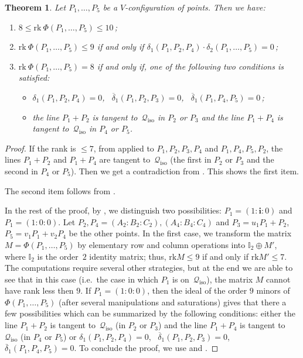 \documentclass{amsart}
\theoremstyle{plain}
\newtheorem{theorem}[lemma]{Theorem}
\theoremstyle{definition}
\newcommand{\iso}{\mathcal{Q}_{\mathrm{iso}}}
\newcommand{\iii}{\textbf{i}}
\newcommand{\rk}{\ensuremath{\mathrm{rk}}}
\begin{document}
\begin{theorem}
\label{theorem:rank_V}
Let $P_1, \dots, P_5$ be a $V$-configuration of
points. Then we have:
\begin{enumerate}
\item $8 \leq \rk \ \Phi(P_1, \dots, P_5) \leq 10$\,;
\item $\rk \ \Phi(P_1, \dots, P_5) \leq 9$ if and only if
$\delta_1(P_1, P_2, P_4) \cdot \delta_2(P_1, \dots, P_5) =0$\,;
\item $\rk \ \Phi(P_1, \dots, P_5) = 8$ if and only if, one of
the following two conditions is satisfied:
%
\begin{itemize}
\item $\delta_1(P_1, P_2, P_4) = 0$, \
$\overline{\delta}_1(P_1, P_2, P_3) = 0$,
\ $\overline{\delta}_1(P_1, P_4, P_5) = 0$\,;
  \item the line $P_1+P_2$ is tangent to~$\iso$ in $P_2$ or $P_3$
and the line $P_1+P_4$ is tangent to~$\iso$ in $P_4$ or $P_5$.
\end{itemize}
%
\end{enumerate}
\end{theorem}
\begin{proof}
If the rank is $\leq 7$, from
 applied to $P_1, P_2, P_3, P_4$ and $P_1, P_4, P_5, P_2$,
the lines $P_1+P_2$ and $P_1 + P_4$ are tangent to~$\iso$ (the first in $P_2$ or $P_3$ and the second in $P_4$ or $P_5$).
Then we get a contradiction from \Cref{lemma:special_case_rank_8}.
This shows the first item.

The second item follows from .

In the rest of the proof, by , we distinguish two possibilities:
$P_1 = (1:\iii :0)$ and
$P_1 = (1: 0: 0)$.
Let $P_2, P_4 = (A_2: B_2: C_2), (A_4: B_4: C_4)$ and
$P_3 = u_1P_1+P_2$, $P_5 = v_1P_1+v_2P_4$ be the other points.
In the first case, we transform the matrix $M = \Phi(P_1, \dots, P_5)$ by elementary row and column operations into $\mathbb{I}_2 \oplus M'$, where $\mathbb{I}_2$ is the order~$2$ identity matrix; thus, $\rk  M \leq 9$ if and only if $\rk  M' \leq 7$.
The computations require several other strategies, but at the end we are
able to see that in this case (i.e.\ the case in which $P_1$ is on~$\iso$), the matrix $M$ cannot have rank less then $9$.
If $P_1 = (1: 0: 0)$, then the ideal of the order $9$ minors of
$\Phi(P_1, \dots, P_5)$ (after several manipulations and saturations)
gives that there a few possibilities which can be summarized by the
following conditions: either the line $P_1+P_2$ is tangent to~$\iso$ (in $P_2$ or $P_3$) and the line $P_1+P_4$ is tangent to~$\iso$ (in $P_4$ or $P_5$) or $\delta_1(P_1, P_2, P_4) = 0$,
\ $\overline{\delta}_1(P_1, P_2, P_3) = 0$,
\ $\overline{\delta}_1(P_1, P_4, P_5) = 0$.
To conclude the proof, we use  and .
\end{proof}
\end{document}
